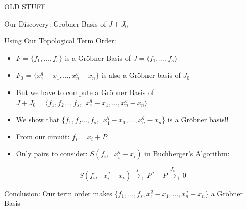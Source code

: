 \documentclass[xcolor=dvipsnames]{beamer}
\begin{document}

\begin{frame}{\large OLD STUFF}
\end{frame}

\begin{frame}{\large{Our Discovery: Gr\"obner Basis of $J + J_0$}}

Using Our Topological Term Order:
\begin{itemize}
\item $F = \{ f_1, \dots, f_s\}$ is a Gr\"obner Basis of $J = \langle
  f_1, \dots, f_s\rangle$
\item $F_0 = \{x_1^q - x_1, \dots, x_n^q - x_n\}$ is also a Gr\"obner
  basis of $J_0$
\item But we have to compute a Gr\"obner Basis of $J + J_0 = \langle
  f_1, f_2 \ldots, f_s, ~~ x_1^q   - x_1, \dots, x_n^q - x_n\rangle$
\item We show that $\{f_1, f_2 \ldots, f_s, ~~ x_1^q   - x_1, \dots,
  x_n^q - x_n\}$ is a Gr\"obner basis!!
\item From our circuit: $f_i = x_i + P$
\item Only pairs to consider: $S(f_i, ~~~x_i^q - x_i)$ in Buchberger's Algorithm:
\end{itemize}

\[
S(f_i, ~~~x_i^q - x_i) \stackrel{J}{\textstyle\longrightarrow}_+ P^q -
P \stackrel{J_0}{\textstyle\longrightarrow}_+ 0
\]

Conclusion: Our term order makes $\{f_1, \dots, f_s, x_1^q - x_1,
\dots, x_n^q - x_n\}$ a Gr\"obner Basis
\end{frame}
\end{document}
